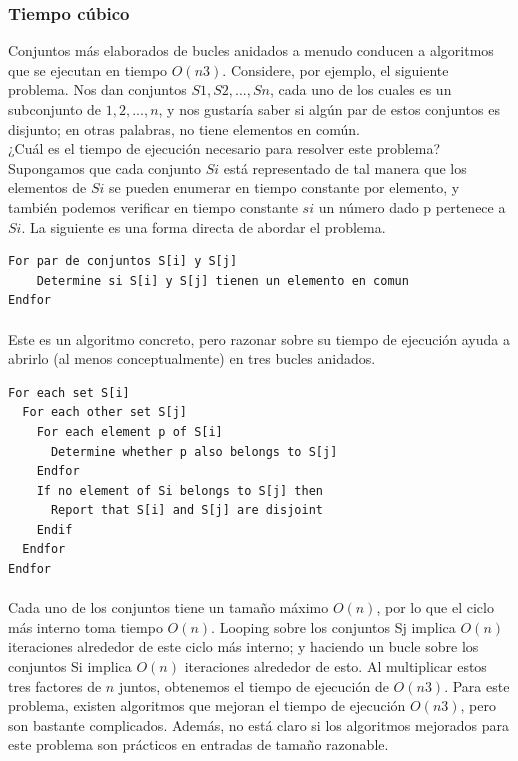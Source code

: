 \documentclass[a4paper, 12pt]{book}
\begin{document}
\subsubsection*{Tiempo cúbico} 

Conjuntos más elaborados de bucles anidados a menudo conducen a algoritmos que se ejecutan en tiempo $O(n3)$. Considere, por ejemplo, el siguiente problema. Nos dan conjuntos $S1, S2, ..., Sn$, cada uno de los cuales es un subconjunto de ${1, 2,. . . , n}$, y nos gustaría saber si algún par de estos conjuntos es disjunto; en otras palabras, no tiene elementos en común.\\

¿Cuál es el tiempo de ejecución necesario para resolver este problema? Supongamos que cada conjunto $Si$ está representado de tal manera que los elementos de $Si$ se pueden enumerar en tiempo constante por elemento, y también podemos verificar en tiempo constante $si$ un número dado p pertenece a $Si$. La siguiente es una forma directa de abordar el problema.\\


\begin{lstlisting}
For par de conjuntos S[i] y S[j]
    Determine si S[i] y S[j] tienen un elemento en comun
Endfor
\end{lstlisting}
\paragraph{}
Este es un algoritmo concreto, pero razonar sobre su tiempo de ejecución ayuda a
abrirlo (al menos conceptualmente) en tres bucles anidados.\\

\begin{lstlisting}
For each set S[i]
  For each other set S[j]
    For each element p of S[i]
      Determine whether p also belongs to S[j]
    Endfor
    If no element of Si belongs to S[j] then
      Report that S[i] and S[j] are disjoint
    Endif
  Endfor
Endfor
\end{lstlisting}
\paragraph{}
Cada uno de los conjuntos tiene un tamaño máximo $O(n)$, por lo que el ciclo más interno toma tiempo $O(n)$. Looping sobre los conjuntos Sj implica $O(n)$ iteraciones alrededor de este ciclo más interno; y haciendo un bucle sobre los conjuntos Si implica $O(n)$ iteraciones alrededor de esto. Al multiplicar estos tres factores de $n$ juntos, obtenemos el tiempo de ejecución de $O(n3)$. Para este problema, existen algoritmos que mejoran el tiempo de ejecución $O(n3)$, pero son bastante complicados. Además, no está claro si los algoritmos mejorados para este problema son prácticos en entradas de tamaño razonable.\\
\end{document}
